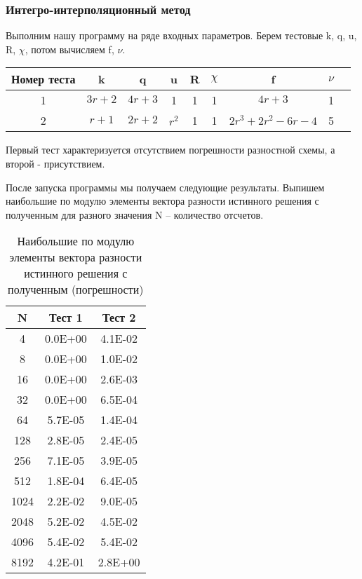 \subsubsection{Интегро-интерполяционный метод}

Выполним нашу программу на ряде входных параметров. Берем тестовые k, q, u, R, $\chi$, потом вычисляем f, $\nu$.

\begin{table}[H]
  \centering
  \begin{tabular}{ c | *{8}c }
    \toprule
    Номер теста & k & q & u & R & $\chi $ & f & $\nu $ \\
    \midrule
    1 & $ 3r+2 $ & $ 4r+3 $ & 1 & 1 & 1 & $ 4r+3 $ & 1 \\
    \midrule
    2 & $ r+1 $ & $ 2r+2 $ & $ r^2 $ & 1 & 1 & $ 2r^3+2r^2-6r-4 $ & 5 \\
    \bottomrule
  \end{tabular}
\end{table}

Первый тест характеризуется отсутствием погрешности разностной схемы, а второй - присутствием.

После запуска программы мы получаем следующие результаты. Выпишем наибольшие по модулю элементы вектора разности истинного решения с полученным для разного значения N – количество отсчетов.

  \begin{table}[H]
    \centering
    \begin{tabular}{c | c | c}
      \toprule
      N & Тест 1 & Тест 2 \\
      \midrule
4 & 0.0E+00 & 4.1E-02 \\
8 & 0.0E+00 & 1.0E-02 \\
16 & 0.0E+00 & 2.6E-03 \\
32 & 0.0E+00 & 6.5E-04 \\
64 & 5.7E-05 & 1.4E-04 \\
128 & 2.8E-05 & 2.4E-05 \\
256 & 7.1E-05 & 3.9E-05 \\
512 & 1.8E-04 & 6.4E-05 \\
1024 & 2.2E-02 & 9.0E-05 \\
2048 & 5.2E-02 & 4.5E-02 \\
4096 & 5.4E-02 & 5.4E-02 \\
8192 & 4.2E-01 & 2.8E+00 \\

      \bottomrule
    \end{tabular}
    \caption{Наибольшие по модулю элементы вектора разности истинного решения с полученным (погрешности)}
  \end{table}

